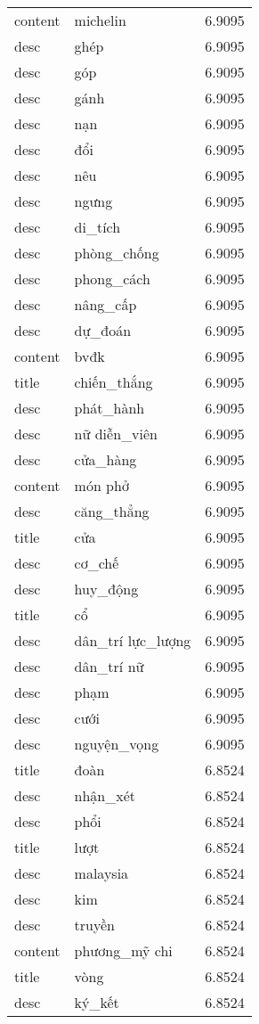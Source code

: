 \documentclass{article}
\begin{document}
\begin{tabular}{lll}
content & michelin & 6.9095\\
desc & ghép & 6.9095\\
desc & góp & 6.9095\\
desc & gánh & 6.9095\\
desc & nạn & 6.9095\\
desc & đổi & 6.9095\\
desc & nêu & 6.9095\\
desc & ngưng & 6.9095\\
desc & di\_tích & 6.9095\\
desc & phòng\_chống & 6.9095\\
desc & phong\_cách & 6.9095\\
desc & nâng\_cấp & 6.9095\\
desc & dự\_đoán & 6.9095\\
content & bvđk & 6.9095\\
title & chiến\_thắng & 6.9095\\
desc & phát\_hành & 6.9095\\
desc & nữ diễn\_viên & 6.9095\\
desc & cửa\_hàng & 6.9095\\
content & món phở & 6.9095\\
desc & căng\_thẳng & 6.9095\\
title & cửa & 6.9095\\
desc & cơ\_chế & 6.9095\\
desc & huy\_động & 6.9095\\
title & cổ & 6.9095\\
desc & dân\_trí lực\_lượng & 6.9095\\
desc & dân\_trí nữ & 6.9095\\
desc & phạm & 6.9095\\
desc & cưới & 6.9095\\
desc & nguyện\_vọng & 6.9095\\
title & đoàn & 6.8524\\
desc & nhận\_xét & 6.8524\\
desc & phổi & 6.8524\\
title & lượt & 6.8524\\
desc & malaysia & 6.8524\\
desc & kim & 6.8524\\
desc & truyền & 6.8524\\
content & phương\_mỹ chi & 6.8524\\
title & vòng & 6.8524\\
desc & ký\_kết & 6.8524\\

\end{tabular}
\end{document}
